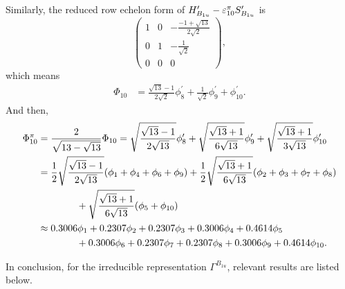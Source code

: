 		Similarly, the reduced row echelon form of $H^\prime_{B_{1u}}-\varepsilon^\pi_{10} S^\prime_{B_{1u}}$ is
		\begin{equation*}
			\begin{pmatrix}
				1	& 0	&	-\frac{-1+\sqrt{13}}{2\sqrt{2}}	\\	0	&	1	&	-\frac{1}{\sqrt{2}}	\\	0	&	0	&	0
			\end{pmatrix},
		\end{equation*}		
		which means
		\begin{align*}
			\Phi_{10} &= \frac{\sqrt{13}-1}{2\sqrt{2}}\phi^\prime_8 + \frac{1}{\sqrt{2}} \phi^\prime_9 + \phi^\prime_{10}.
		\end{align*}
		And then,
		\begin{align}
			\Phi^\pi_{10} &= \frac{2}{\sqrt{13-\sqrt{13}}} \Phi_{10} = \sqrt{\frac{\sqrt{13}-1}{2\sqrt{13}}} \phi^\prime_8 + \sqrt{\frac{\sqrt{13}+1}{6\sqrt{13}}} \phi^\prime_9	+ \sqrt{\frac{\sqrt{13}+1}{3\sqrt{13}}} \phi^\prime_{10}\notag \\
			&= \frac{1}{2}\sqrt{\frac{\sqrt{13}-1}{2\sqrt{13}}}(\phi_1 + \phi_4 + \phi_6 + \phi_9) + \frac{1}{2}\sqrt{\frac{\sqrt{13}+1}{6\sqrt{13}}} (\phi_2 + \phi_3 + \phi_7 + \phi_8) \notag \\
			&\hspace*{4em}+ \sqrt{\frac{\sqrt{13}+1}{6\sqrt{13}}} (\phi_5 +\phi_{10})  \notag \\
			&\approx 0.3006 \phi_1 + 0.2307 \phi_2 +0.2307 \phi_3 +0.3006 \phi_4 + 0.4614 \phi_5 \notag \\
			&\hspace*{4em} + 0.3006\phi_6 +0.2307 \phi_7 + 0.2307 \phi_8 + 0.3006 \phi_9 + 0.4614 \phi_{10}.
		\end{align}

		In conclusion, for the irreducible representation $\Gamma^{B_{1u}}$, relevant results are listed below.
		
